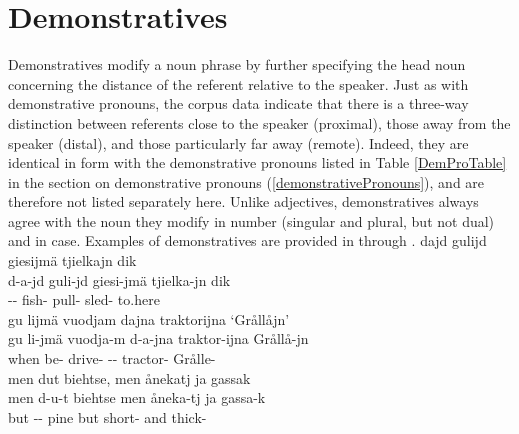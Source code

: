 \section{Demonstratives}\label{demonstratives}
Demonstratives %
modify a noun phrase by further specifying the head noun concerning the distance of the referent relative to the speaker. Just as with demonstrative pronouns, the corpus data indicate that there is a three-way distinction between referents close to the speaker (proximal), those away from the speaker (distal), and those particularly far away (remote). 
Indeed, they are identical in form with the demonstrative pronouns listed in Table \vref{DemProTable} in the section on demonstrative pronouns (\SEC\ref{demonstrativePronouns}), and are therefore not listed separately here. 
Unlike adjectives, demonstratives always agree with the noun they modify in number (singular and plural, but not dual) and in case. %
Examples of demonstratives %
are provided in  through .
\ea\label{demonstrativeAdjectivesEx1}
\glll	dajd gulijd giesijmä tjielkajn dik\\
	d-a-jd guli-jd giesi-jmä tjielka-jn dik\\
	-- fish- pull- sled- to.here\\\nopagebreak
{}	
\z
\ea\label{demonstrativeAdjectivesEx2}
\glll	gu lijmä vuodjam dajna traktorijna ‘Grållåjn’\\
	gu li-jmä vuodja-m d-a-jna traktor-ijna Grållå-jn\\
	when be- drive- -- tractor- Grålle-\\\nopagebreak
{}	
\z
\ea\label{demonstrativeAdjectivesEx3}
\glll	men dut biehtse, men ånekatj ja gassak\\
	men d-u-t biehtse men åneka-tj ja gassa-k\\
	but -- pine\BS{} but short- and thick-\\\nopagebreak
{}	
\z




